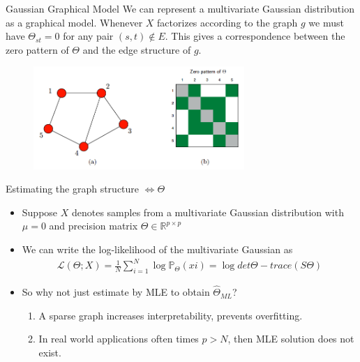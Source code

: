 \documentclass{beamer}
\begin{document}
\begin{frame}{Gaussian Graphical Model}
We can represent a multivariate Gaussian distribution as a graphical model.
Whenever $X$ factorizes according to the graph $g$ we must have $\Theta_{st} = 0$ for any pair $(s,t) \notin E$. This gives a correspondence between the zero pattern of $\Theta$ and the edge structure of $g$.
	\begin{figure}
		\includegraphics[trim={0 1.4cm 0 0}, clip,width = 8cm]{IntroGraphMat}
	\end{figure}
\end{frame}


\begin{frame}{Estimating the graph structure $\Leftrightarrow \Theta$}
  \begin{itemize}
      \item Suppose $X$ denotes samples from a multivariate Gaussian distribution with $\mu = 0$ and precision matrix $\Theta \in \mathbb{R}^{p \times p}$
    \item We can write the log-likelihood of the multivariate Gaussian as
    \begin{align*}
    	\mathcal{L}(\Theta; X) = \frac{1}{N} \sum_{i=1}^N \log \mathbb{P}_{\Theta}(xi) = \log det \Theta - trace (S \Theta)
    \end{align*}
    \item So why not just estimate by MLE to obtain $\widehat{\Theta}_{ML}$?
    \begin{enumerate}
    	\item A sparse graph increases interpretability, prevents overfitting.
    	\item In real world applications often times $p > N$, then MLE solution does not exist.
    \end{enumerate}
  \end{itemize}
\end{frame}
\end{document}
